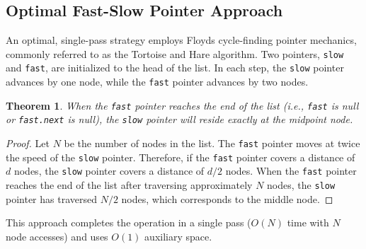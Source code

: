\documentclass[10pt,journal,compsoc,onecolumn]{IEEEtran}
\newtheorem{theorem}{Theorem}
\begin{document}
\subsection{Optimal Fast-Slow Pointer Approach}
An optimal, single-pass strategy employs Floyds cycle-finding pointer mechanics, commonly referred to as the Tortoise and Hare algorithm. Two pointers, \texttt{slow} and \texttt{fast}, are initialized to the head of the list. In each step, the \texttt{slow} pointer advances by one node, while the \texttt{fast} pointer advances by two nodes.

\begin{theorem}
When the \texttt{fast} pointer reaches the end of the list (i.e., \texttt{fast} is null or \texttt{fast.next} is null), the \texttt{slow} pointer will reside exactly at the midpoint node.
\end{theorem}
\begin{proof}
Let $N$ be the number of nodes in the list. The \texttt{fast} pointer moves at twice the speed of the \texttt{slow} pointer. Therefore, if the \texttt{fast} pointer covers a distance of $d$ nodes, the \texttt{slow} pointer covers a distance of $d/2$ nodes. When the \texttt{fast} pointer reaches the end of the list after traversing approximately $N$ nodes, the \texttt{slow} pointer has traversed $N/2$ nodes, which corresponds to the middle node.
\end{proof}

This approach completes the operation in a single pass ($O(N)$ time with $N$ node accesses) and uses $O(1)$ auxiliary space.
\end{document}
